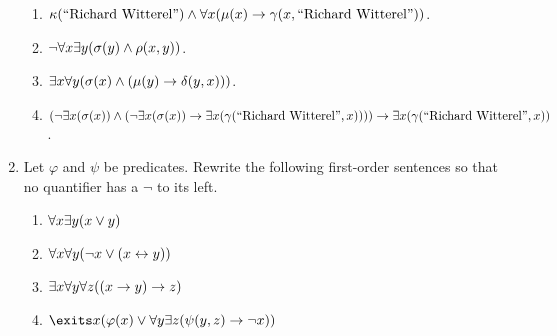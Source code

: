 \begin{enumerate}
\begin{enumerate}
            \item
                $\kappa(\text{``Richard Witterel''}) \meet
                \forall x \pn*{\mu(x) \rightarrow \gamma(x, \text{``Richard Witterel''})}$.
            \item
                $\neg \forall x \exists y \pn*{\sigma(y) \meet \rho(x, y)}$.
            \item
                $\exists x \forall y \pn*{\sigma(x) \meet (\mu(y) \rightarrow \delta(y, x))}$.
            \item
                $\pn*{\neg \exists x \pn*{\sigma(x)}
                          \meet \pn*{\neg \exists x \pn*{\sigma(x)}
                          \rightarrow \exists x \pn*{\gamma(\text{``Richard Witterel''}, x)}}}
                 \rightarrow \exists x \pn*{\gamma(\text{``Richard Witterel''}, x)}$.
        \end{enumerate}
    \item
        Let $\varphi$ and $\psi$ be predicates.
        Rewrite the following first-order sentences so that no quantifier has a $\neg$ to its left.
        \begin{enumerate}
            \item
                $\forall x \exists y (x \vee y)$
            \item
                $\forall x \forall y (\neg x \vee (x \leftrightarrow y))$
            \item
                $\exists x \forall y \forall z \pn*{\pn*{x \rightarrow y} \rightarrow z}$
            \item
                $\exits x \pn*{\varphi(x) \join \forall y \exists z \pn*{\psi(y, z) \rightarrow \neg x}}$
        \end{enumerate}
\end{enumerate}

